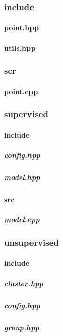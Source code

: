 \documentclass[12pt]{article}
\newcommand{\incDemo}[2]{\label{demo:#2}}
\begin{document}
\subsubsection{include}													%
\paragraph{point.hpp}													\incDemo{c++}{include/point.hpp}
\paragraph{utils.hpp}														\incDemo{c++}{include/utils.hpp}
\subsubsection{scr}														%
\paragraph{point.cpp}													\incDemo{c++}{scr/point.cpp}
\subsubsection{supervised}											%
\paragraph{include}														%
\subparagraph{config.hpp}											\incDemo{c++}{supervised/include/config.hpp}
\subparagraph{model.hpp}											\incDemo{c++}{supervised/include/model.hpp}
\paragraph{src}																%
\subparagraph{model.cpp}												\incDemo{c++}{supervised/src/model.cpp}
\subsubsection{unsupervised}										%
\paragraph{include}														%
\subparagraph{cluster.hpp}											\incDemo{c++}{unsupervised/include/cluster.hpp}
\subparagraph{config.hpp}											\incDemo{c++}{unsupervised/include/config.hpp}
\subparagraph{group.hpp}												\incDemo{c++}{unsupervised/include/group.hpp}
\end{document}
